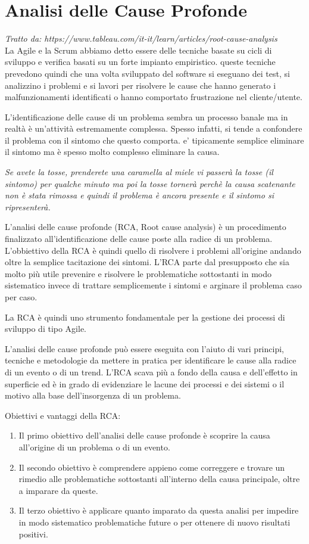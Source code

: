 \section{Analisi delle Cause Profonde}
\textit{ \tiny Tratto da: https://www.tableau.com/it-it/learn/articles/root-cause-analysis}\\


La Agile e la Scrum abbiamo detto essere delle tecniche basate su cicli di sviluppo e verifica basati su un forte impianto empiristico. queste tecniche prevedono quindi che una volta sviluppato del software si eseguano dei test, si analizzino i problemi e si lavori per risolvere le cause che hanno generato i malfunzionamenti identificati o hanno comportato frustrazione nel cliente/utente.

L'identificazione delle cause di un problema sembra un processo banale ma in realtà è un'attività estremamente complessa. Spesso infatti, si tende a confondere il problema con il sintomo che questo comporta. e' tipicamente semplice eliminare il sintomo ma è spesso molto complesso eliminare la causa.

\textit{Se avete la tosse, prenderete una caramella al miele vi passerà la tosse (il sintomo) per qualche minuto ma poi la tosse tornerà perchè la causa scatenante non è stata rimossa e quindi il problema è ancora presente e il sintomo si ripresenterà.}

L'analisi delle cause profonde (RCA, Root cause analysis) è un procedimento finalizzato all'identificazione delle cause poste alla radice di un problema. L'obbiettivo della RCA è quindi quello di risolvere i problemi all'origine andando oltre la semplice tacitazione dei sintomi. L'RCA parte dal presupposto che sia molto più utile prevenire e risolvere le problematiche sottostanti in modo sistematico invece di trattare semplicemente i sintomi e arginare il problema caso per caso.

La RCA è quindi uno strumento fondamentale per la gestione dei processi di sviluppo di tipo Agile.

L'analisi delle cause profonde può essere eseguita con l'aiuto di vari principi, tecniche e metodologie da mettere in pratica per identificare le cause alla radice di un evento o di un trend. L'RCA scava più a fondo della causa e dell'effetto in superficie ed è in grado di evidenziare le lacune dei processi e dei sistemi o il motivo alla base dell'insorgenza di un problema.

Obiettivi e vantaggi della RCA:
\begin{enumerate}
    \item Il primo obiettivo dell'analisi delle cause profonde è scoprire la causa all'origine di un problema o di un evento.
    \item Il secondo obiettivo è comprendere appieno come correggere e trovare un rimedio alle problematiche sottostanti all'interno della causa principale, oltre a imparare da queste.
    \item Il terzo obiettivo è applicare quanto imparato da questa analisi per impedire in modo sistematico problematiche future o per ottenere di nuovo risultati positivi.

\end{enumerate}

